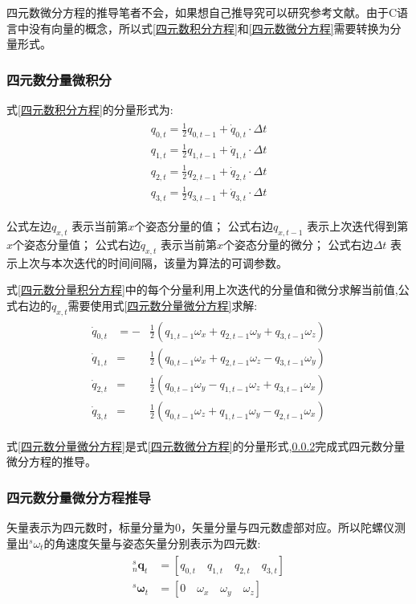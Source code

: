 \documentclass[12pt,a4paper]{article}
\renewcommand{\citet}[1]{\textsuperscript{\cite{#1}}}
\begin{document}
四元数微分方程的推导笔者不会，如果想自己推导究可以研究参考文献\citet{四元数微分方程的推导}。由于C语言中没有向量的概念，所以式\ref{四元数积分方程}和\ref{四元数微分方程}需要转换为分量形式。
\subsubsection{四元数分量微积分}
式\ref{四元数积分方程}的分量形式为:
\begin{eqnarray}\label{四元数分量积分方程}
    \begin{split}
        q_{0,t} = \frac{1}{2}q_{0,t-1} + \dot{q}_{0,t} \cdot \Delta t \\ 
        q_{1,t} = \frac{1}{2}q_{1,t-1} + \dot{q}_{1,t} \cdot \Delta t \\
        q_{2,t} = \frac{1}{2}q_{2,t-1} + \dot{q}_{2,t} \cdot \Delta t \\
        q_{3,t} = \frac{1}{2}q_{3,t-1} + \dot{q}_{3,t} \cdot \Delta t
    \end{split}
\end{eqnarray} 

公式左边$q_{x,t}$       表示当前第$x$个姿态分量的值；
公式右边$q_{x,t-1}$     表示上次迭代得到第$x$个姿态分量值；
公式右边$\dot{q}_{x,t}$ 表示当前第$x$个姿态分量的微分；
公式右边$\Delta t$      表示上次与本次迭代的时间间隔，该量为算法的可调参数。

式\ref{四元数分量积分方程}中的每个分量利用上次迭代的分量值和微分求解当前值,公式右边的$\dot{q}_{x,t}$需要使用式\ref{四元数分量微分方程}求解:
\begin{eqnarray}\label{四元数分量微分方程}
    \begin{split}
        \dot{q}_{0,t}&=- &\frac{1}{2}(q_{1,t-1}\omega_x+q_{2,t-1}\omega_y+q_{3,t-1}\omega_z) \\
        \dot{q}_{1,t}&=  &\frac{1}{2}(q_{0,t-1}\omega_x+q_{2,t-1}\omega_z-q_{3,t-1}\omega_y) \\
        \dot{q}_{2,t}&=  &\frac{1}{2}(q_{0,t-1}\omega_y-q_{1,t-1}\omega_z+q_{3,t-1}\omega_x) \\
        \dot{q}_{3,t}&=  &\frac{1}{2}(q_{0,t-1}\omega_z+q_{1,t-1}\omega_y-q_{2,t-1}\omega_x)
    \end{split}
\end{eqnarray} 

式\ref{四元数分量微分方程}是式\ref{四元数微分方程}的分量形式,\ref{section:四元数分量微分方程推导}完成式四元数分量微分方程的推导。
\subsubsection{四元数分量微分方程推导}\label{section:四元数分量微分方程推导}
矢量表示为四元数时，标量分量为0，矢量分量与四元数虚部对应。所以陀螺仪测量出$^s\omega_t$的角速度矢量与姿态矢量分别表示为四元数:
\begin{eqnarray}\label{四元数分量方程}
    \begin{split}
        ^s_n\bm{q}_t&=[q_{0,t}\quad q_{1,t}\quad q_{2,t}\quad q_{3,t}] \\
        ^s\bm{\omega}_t&=[0\quad \omega_x\quad \omega_y\quad \omega_z]
    \end{split}
\end{eqnarray} 
\end{document}
